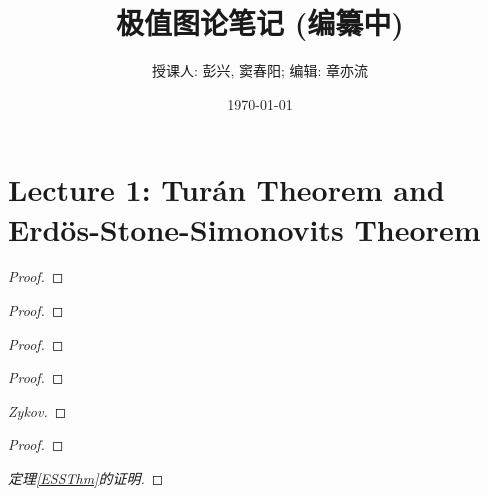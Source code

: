 \documentclass[11pt]{article}
\title{极值图论笔记 (编纂中)}
\author{授课人: 彭兴, 窦春阳; 编辑: 章亦流}
\date{\today}
\begin{document}
\maketitle

\section{Lecture 1: Tur\'an Theorem and Erd\"os-Stone-Simonovits Theorem}
\begin{definition}
    
\end{definition}
\begin{theorem}[Mantel, 1902]
    
\end{theorem}
\begin{proof}
    
\end{proof}
\begin{proof}
    
\end{proof}
\begin{proof}
    
\end{proof}
\begin{theorem}[Tur\'an, 1941]
    
\end{theorem}
\begin{proof}
    
\end{proof}
\begin{proof}[Zykov]
    
\end{proof}
\begin{theorem}\label{ESSThm}
    
\end{theorem}
\begin{lemma}
    
\end{lemma}
\begin{proof}
    
\end{proof}
\begin{proof}[定理\ref{ESSThm}的证明]
    
\end{proof}

\newpage
\end{document}
